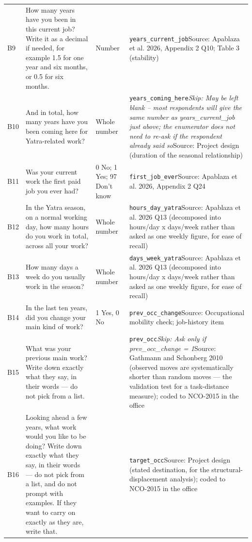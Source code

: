 \documentclass[10pt]{article}
\begin{document}
{\begin{longtable}{p{0.8cm}p{6.4cm}p{3.6cm}p{5.8cm}}
B9 & How many years have you been in this current job? Write it as a decimal if needed, for example 1.5 for one year and six months, or 0.5 for six months. & Number & \texttt{years\_current\_job}\newline Source: Apablaza et al. 2026, Appendix 2 Q10; Table 3 (stability) \\
B10 & And in total, how many years have you been coming here for Yatra-related work? & Whole number & \texttt{years\_coming\_here}\newline \textit{Skip: May be left blank -- most respondents will give the same number as years\_current\_job just above; the enumerator does not need to re-ask if the respondent already said so}\newline Source: Project design (duration of the seasonal relationship) \\
B11 & Was your current work the first paid job you ever had? & 0 No; 1 Yes; 97 Don't know & \texttt{first\_job\_ever}\newline Source: Apablaza et al. 2026, Appendix 2 Q24 \\
B12 & In the Yatra season, on a normal working day, how many hours do you work in total, across all your work? & Whole number & \texttt{hours\_day\_yatra}\newline Source: Apablaza et al. 2026 Q13 (decomposed into hours/day x days/week rather than asked as one weekly figure, for ease of recall) \\
B13 & How many days a week do you usually work in the season? & Whole number & \texttt{days\_week\_yatra}\newline Source: Apablaza et al. 2026 Q13 (decomposed into hours/day x days/week rather than asked as one weekly figure, for ease of recall) \\
B14 & In the last ten years, did you change your main kind of work? & 1 Yes, 0 No & \texttt{prev\_occ\_change}\newline Source: Occupational mobility check; job-history item \\
B15 & What was your previous main work? Write down exactly what they say, in their words — do not pick from a list. &  & \texttt{prev\_occ}\newline \textit{Skip: Ask only if prev\_occ\_change = 1}\newline Source: Gathmann and Schonberg 2010 (observed moves are systematically shorter than random moves — the validation test for a task-distance measure); coded to NCO-2015 in the office \\
B16 & Looking ahead a few years, what work would you like to be doing? Write down exactly what they say, in their words — do not pick from a list, and do not prompt with examples. If they want to carry on exactly as they are, write that. &  & \texttt{target\_occ}\newline Source: Project design (stated destination, for the structural-displacement analysis); coded to NCO-2015 in the office \\

\end{longtable}}
\end{document}
